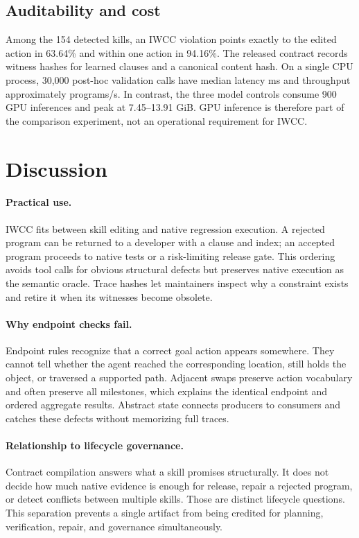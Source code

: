 \documentclass[10pt]{article}
\begin{document}
\subsection{Auditability and cost}
Among the 154 detected kills, an IWCC violation points exactly to the edited action in 63.64\% and within one action in 94.16\%. The released contract records witness hashes for learned clauses and a canonical content hash. On a single CPU process, 30,000 post-hoc validation calls have median latency \MedianRuntime{} ms and throughput approximately \RuntimeThroughput{} programs/s. In contrast, the three model controls consume 900 GPU inferences and peak at 7.45--13.91 GiB. GPU inference is therefore part of the comparison experiment, not an operational requirement for IWCC.

\section{Discussion}
\paragraph{Practical use.}
IWCC fits between skill editing and native regression execution. A rejected program can be returned to a developer with a clause and index; an accepted program proceeds to native tests or a risk-limiting release gate. This ordering avoids tool calls for obvious structural defects but preserves native execution as the semantic oracle. Trace hashes let maintainers inspect why a constraint exists and retire it when its witnesses become obsolete.

\paragraph{Why endpoint checks fail.}
Endpoint rules recognize that a correct goal action appears somewhere. They cannot tell whether the agent reached the corresponding location, still holds the object, or traversed a supported path. Adjacent swaps preserve action vocabulary and often preserve all milestones, which explains the identical endpoint and ordered aggregate results. Abstract state connects producers to consumers and catches these defects without memorizing full traces.

\paragraph{Relationship to lifecycle governance.}
Contract compilation answers what a skill promises structurally. It does not decide how much native evidence is enough for release, repair a rejected program, or detect conflicts between multiple skills. Those are distinct lifecycle questions. This separation prevents a single artifact from being credited for planning, verification, repair, and governance simultaneously.
\end{document}
